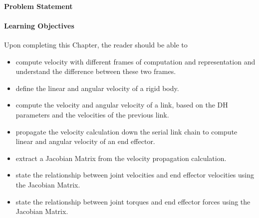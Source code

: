 
\paragraph{Problem Statement}
 
\paragraph{Learning Objectives}
Upon completing this Chapter, the reader should be able to
\begin{itemize}
  \item compute velocity with different frames of computation and representation and understand the difference between these two frames. 

  \item define the linear and angular velocity of a rigid body. 

  \item compute the velocity and angular velocity of a link, based on the DH parameters and the velocities of the previous link.

  \item propagate the velocity calculation down the serial link chain to compute linear and angular velocity of an end effector. 

  \item extract a Jacobian Matrix from the velocity propagation calculation. 

  \item  state the relationship between joint velocities and end effector velocities using the Jacobian Matrix. 

  \item state the relationship between joint torques and end effector forces using the Jacobian Matrix. 
\end{itemize}